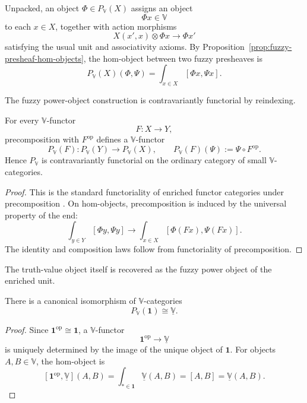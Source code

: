 Unpacked, an object \(\Phi\in P_{\mathbb V}(X)\) assigns an object
\[
    \Phi x\in\mathbb V
\]
to each \(x\in X\), together with action morphisms
\[
    X(x',x)\otimes \Phi x
    \longrightarrow
    \Phi x'
\]
satisfying the usual unit and associativity axioms. By Proposition~\ref{prop:fuzzy-presheaf-hom-objects}, the hom-object between two fuzzy presheaves is
\[
    P_{\mathbb V}(X)(\Phi,\Psi)
    =
    \int_{x\in X}[\Phi x,\Psi x].
\]

The fuzzy power-object construction is contravariantly functorial by reindexing.

\begin{proposition}
\label{prop:enriched-power-object-functor}
    For every \(\mathbb V\)-functor
    \[
        F:X\to Y,
    \]
    precomposition with \(F^{\mathrm{op}}\) defines a \(\mathbb V\)-functor
    \[
        P_{\mathbb V}(F):P_{\mathbb V}(Y)\to P_{\mathbb V}(X),
        \qquad
        P_{\mathbb V}(F)(\Psi):=\Psi\circ F^{\mathrm{op}}.
    \]
    Hence \(P_{\mathbb V}\) is contravariantly functorial on the ordinary category of small \(\mathbb V\)-categories.
\end{proposition}

\begin{proof}
    This is the standard functoriality of enriched functor categories under precomposition \cite[Section~2.2]{Kelly1982BasicConcepts}. On hom-objects, precomposition is induced by the universal property of the end:
    \[
        \int_{y\in Y}[\Phi y,\Psi y]
        \longrightarrow
        \int_{x\in X}[\Phi(Fx),\Psi(Fx)].
    \]
    The identity and composition laws follow from functoriality of precomposition.
\end{proof}

The truth-value object itself is recovered as the fuzzy power object of the enriched unit.

\begin{proposition}
\label{prop:enriched-power-of-unit}
    There is a canonical isomorphism of \(\mathbb V\)-categories
    \[
        P_{\mathbb V}(\mathbf 1)\cong \underline{\mathbb V}.
    \]
\end{proposition}

\begin{proof}
    Since \(\mathbf 1^{\mathrm{op}}\cong \mathbf 1\), a \(\mathbb V\)-functor
    \[
        \mathbf 1^{\mathrm{op}}\to\underline{\mathbb V}
    \]
    is uniquely determined by the image of the unique object of \(\mathbf 1\). For objects \(A,B\in\mathbb V\), the hom-object is
    \[
        [\mathbf 1^{\mathrm{op}},\underline{\mathbb V}](A,B)
        =
        \int_{\ast\in\mathbf 1}\underline{\mathbb V}(A,B)
        =
        [A,B]
        =
        \underline{\mathbb V}(A,B).
    \]
\end{proof}


